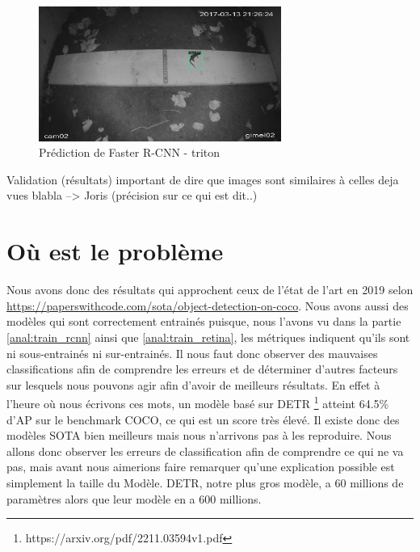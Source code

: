 \begin{figure}[H]
    \centering
    \includegraphics[width=300px]{images/Eval_FasterRCNN_triton.png}
    \caption{Prédiction de Faster R-CNN - triton}
    \label{fig:fasterRcnn_triton}
\end{figure}

Validation (résultats) important de dire que images sont similaires à celles deja vues blabla --> Joris (précision sur ce qui est dit..)

\section{Où est le problème}

Nous avons donc des résultats qui approchent ceux de l'état de l'art en 2019 selon \url{https://paperswithcode.com/sota/object-detection-on-coco}. Nous avons aussi des modèles qui sont correctement entrainés puisque, nous l'avons vu dans la partie \ref{anal:train_rcnn} ainsi que \ref{anal:train_retina}, les métriques indiquent qu'ils sont ni sous-entrainés ni sur-entrainés. Il nous faut donc observer des mauvaises classifications afin de comprendre les erreurs et de déterminer d'autres facteurs sur lesquels nous pouvons agir afin d'avoir de meilleurs résultats. En effet à l'heure où nous écrivons ces mots, un modèle basé sur DETR \footnote[1]{https://arxiv.org/pdf/2211.03594v1.pdf} atteint 64.5\% d'AP sur le benchmark COCO, ce qui est un score très élevé. Il existe donc des modèles SOTA bien meilleurs mais nous n'arrivons pas à les reproduire. Nous allons donc observer les erreurs de classification afin de comprendre ce qui ne va pas, mais avant nous aimerions faire remarquer qu'une explication possible est simplement la taille du Modèle. DETR, notre plus gros modèle, a 60 millions de paramètres alors que leur modèle en a 600 millions.

